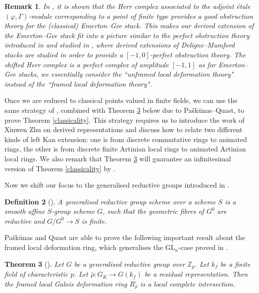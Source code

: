 \documentclass[10pt]{article}
\newtheorem{thm}{Theorem}[section]
\newtheorem{rmk}[thm]{Remark}
\newtheorem{dfn}[thm]{Definition}
\numberwithin{equation}{section}
\newcommand{\bZ}{{\mathbb Z}}
\newcommand{\GL}{{\mathrm{GL}}}             %
\begin{document}
 

\begin{rmk}
    In \cite{EG22}, it is shown that the Herr complex associated to the adjoint \'etale $(\varphi,\Gamma)$-module corresponding to a point of finite type provides a good obstruction theory for the (classical) Emerton--Gee stack. This makes our derived extension of the Emerton--Gee stack fit into a picture similar to the perfect obstruction theory introduced in \cite{BF97} and studied in \cite{STV15}, where derived extensions of Deligne--Mumford stacks are studied in order to provide a $[-1,0]$-perfect obstruction theory. The shifted Herr complex is a perfect complex of amplitude $[-1,1]$ as for Emerton--Gee stacks, we essentially consider the ``unframed local deformation theory" instead of the ``framed local deformation theory".
\end{rmk}

Once we are reduced to classical points valued in finite fields, we can use the same strategy of \cite[Proposition 3.51]{Min23}, combined with Theorem \ref{inf} below due to Paškūnas--Quast,  to prove Theorem \ref{classicality}. This strategy requires us to introduce the work \cite{Zhu20} of Xinwen Zhu on derived representations and discuss how to relate two different kinds of left Kan extension: one is from discrete commutative rings to animated rings, the other is from discrete finite Artinian local rings to animated Artinian local rings. We also remark that Theorem \ref{inf} will guarantee an infinitesimal version of Theorem \ref{classicality} by \cite[lemma 7.5]{GV18}.

Now we shift our focus to the generalised reductive groups introduced in \cite{PQ24}.

\begin{dfn}[{\cite[Definition 2.5]{PQ24}}]
    A generalised reductive group scheme over a scheme $S$ is a smooth
aﬃne $S$-group scheme $G$, such that the geometric fibres of $G^0$ are reductive and $G/G^0\to S$ is finite.
\end{dfn}
Paškūnas and Quast are able to prove the following important result about the framed local deformation ring, which generalises the $\GL_n$-case proved in \cite{BIP23}.

\begin{thm}[{\cite[Theorem 1.1]{PQ24}}]\label{inf}
   Let $G$ be a generalised reductive group over $\bZ_p$. Let $k_f$ be a finite field of characteristic $p$. Let $\bar\rho:G_K\to G(k_f)$ be a residual representation. Then the framed local Galois deformation ring $R^{\square}_{\bar \rho}$ is a local complete intersection.
\end{thm}
\end{document}
